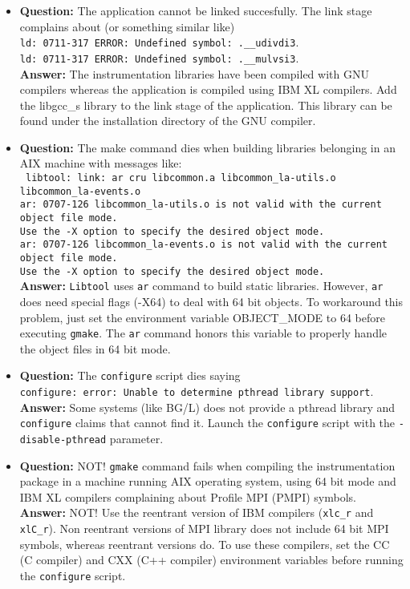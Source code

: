 \begin{itemize}
\item {\bf Question:} The application cannot be linked succesfully. The link stage complains about (or something similar like)\\
      {\tt ld: 0711-317 ERROR: Undefined symbol: .\_\_udivdi3}.\\
      {\tt ld: 0711-317 ERROR: Undefined symbol: .\_\_mulvsi3}.\\
      {\bf Answer:  } The instrumentation libraries have been compiled with GNU compilers whereas the application is compiled using IBM XL compilers. Add the libgcc\_s library to the link stage of the application. This library can be found under the installation directory of the GNU compiler.

\item {\bf Question:} The make command dies when building libraries belonging \TRACE in an AIX machine with messages like:\\
      {\tt
      libtool: link: ar cru libcommon.a libcommon\_la-utils.o libcommon\_la-events.o\\
      ar: 0707-126 libcommon\_la-utils.o is not valid with the current object file mode.\\
              Use the -X option to specify the desired object mode.\\
      ar: 0707-126 libcommon\_la-events.o is not valid with the current object file mode.\\
              Use the -X option to specify the desired object mode.\\
      }
      {\bf Answer:  } {\tt Libtool} uses {\tt ar} command to build static libraries. However, {\tt ar} does need special flags (-X64) to deal with 64 bit objects. To workaround this problem, just set the environment variable OBJECT\_MODE to 64 before executing {\tt gmake}. The {\tt ar} command honors this variable to properly handle the object files in 64 bit mode.

\item {\bf Question:} The {\tt configure} script dies saying\\
      {\tt configure: error: Unable to determine pthread library support}.\\
      {\bf Answer:  } Some systems (like BG/L) does not provide a pthread library and {\tt configure} claims that cannot find it. Launch the {\tt configure} script with the {\tt -disable-pthread} parameter.

\item {\bf Question:} {NOT!} {\tt gmake} command fails when compiling the instrumentation package in a machine running AIX operating system, using 64 bit mode and IBM XL compilers complaining about Profile MPI (PMPI) symbols.\\
      {\bf Answer:  } {NOT!} Use the reentrant version of IBM compilers ({\tt xlc\_r} and {\tt xlC\_r}). Non reentrant versions of MPI library does not include 64 bit MPI symbols, whereas reentrant versions do. To use these compilers, set the CC (C compiler) and CXX (C++ compiler) environment variables before running the {\tt configure} script.


\end{itemize}
